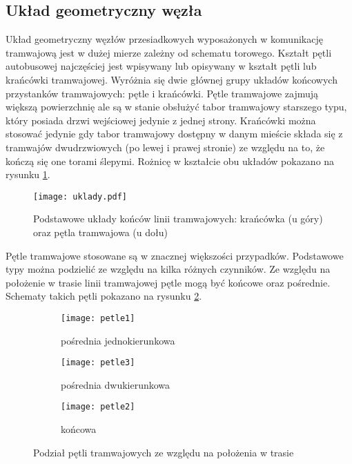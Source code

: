\documentclass[twoside,12pt]{article}
\begin{document}
	\clearpage
	\subsection{Układ geometryczny węzła}
	
	Układ geometryczny węzłów przesiadkowych wyposażonych w komunikację tramwajową jest w dużej mierze zależny od schematu torowego. Kształt pętli autobusowej najczęściej jest wpisywany lub opisywany w kształt pętli lub krańcówki tramwajowej. Wyróżnia się dwie głównej grupy układów końcowych przystanków tramwajowych: pętle i krańcówki. Pętle tramwajowe zajmują większą powierzchnię ale są w stanie obsłużyć tabor tramwajowy starszego typu, który posiada drzwi wejściowej jedynie z jednej strony. Krańcówki można stosować jedynie gdy tabor tramwajowy dostępny w danym mieście składa się z tramwajów dwudrzwiowych (po lewej i prawej stronie) ze względu na to, że kończą się one torami ślepymi. Rożnicę w kształcie obu układów pokazano na rysunku \ref{uklady}.
	
	\begin{figure}[H]
		\centering
		\texttt{[image: uklady.pdf]}\\

		\caption{Podstawowe układy końców linii tramwajowych: krańcówka (u góry) oraz pętla tramwajowa (u dołu)}		
				\label{uklady}
	\end{figure}
	
	Pętle tramwajowe stosowane są w znacznej większości przypadków. Podstawowe typy można podzielić ze względu na kilka różnych czynników. Ze względu na położenie w trasie linii tramwajowej pętle mogą być końcowe oraz pośrednie. Schematy takich pętli pokazano na rysunku \ref{petle1}.
	
	\begin{figure}[H]	
	\centering
	\begin{subfigure}{.33\textwidth}
	  \centering
	  \texttt{[image: petle1]}
	  \caption{pośrednia jednokierunkowa}
	\end{subfigure}%
	\begin{subfigure}{.33\textwidth}
	  \centering
	  \texttt{[image: petle3]}
	  \caption{pośrednia dwukierunkowa}
	\end{subfigure}%
	\begin{subfigure}{.33\textwidth}
	  \centering
	  \texttt{[image: petle2]}
	  \caption{końcowa}
	\end{subfigure}

	\caption{Podział pętli tramwajowych ze względu na położenia w trasie}\label{petle1}
	\end{figure}
\end{document}
